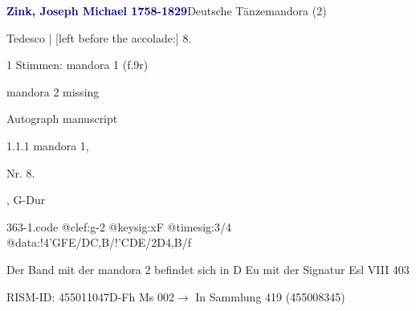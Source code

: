 \documentclass[twocolumn]{book}
\begin{document}
\par \vspace{7pt} \textcolor{darkblue}{\textbf{Zink, Joseph Michael  1758-1829}}\hfillplus{\textbf{[363]}}\newline Deutsche Tänze\newline mandora (2)
\par \begin{itshape}[f.9v, at left:] Tedesco | [left before the accolade:] 8.\end{itshape} 
\par \textcolor{darkblue}{}  1 Stimmen: mandora 1  (f.9r)\newline \begin{small} mandora 2 missing\end{small} \newline Autograph manuscript
\par 1.1.1  mandora 1, \begin{itshape}Nr. 8.\end{itshape}, G-Dur  
\begin{filecontents*}{363-1.code}
@clef:g-2
@keysig:xF
@timesig:3/4
@data:!4'GFE/DC,B/!'CDE/2D4,B/f
\end{filecontents*}
\newline
%
\par Der Band mit der mandora 2 befindet sich in D Eu mit der Signatur Esl VIII 403
\par RISM-ID: 455011047\newline D-Fh  Ms 002\newline $\rightarrow$ In Sammlung 419 (455008345)
      
\end{document}
